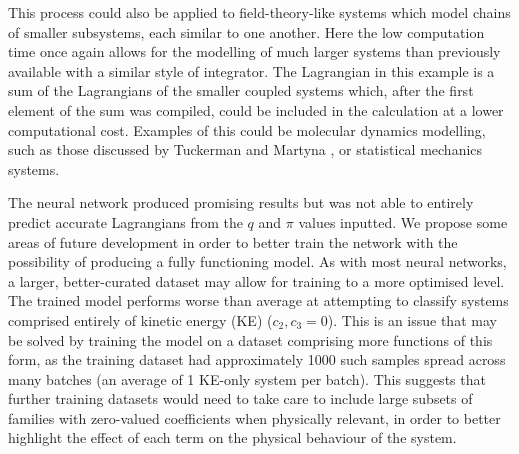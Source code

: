 \documentclass[10pt]{iopart}
\begin{document}
This process could also be applied to field-theory-like systems which model chains of smaller subsystems, each similar to one another. Here the low computation time once again allows for the modelling of much larger systems than previously available with a similar style of integrator. The Lagrangian in this example is a sum of the Lagrangians of the smaller coupled systems which, after the first element of the sum was compiled, could be included in the calculation at a lower computational cost. Examples of this could be molecular dynamics modelling, such as those discussed by Tuckerman and Martyna \cite{MolecularDynamics}, or statistical mechanics systems. 

The neural network produced promising results but was not able to entirely predict accurate Lagrangians from the $q$ and $\pi$ values inputted. We propose some areas of future development in order to better train the network with the possibility of producing a fully functioning model. As with most neural networks, a larger, better-curated dataset may allow for training to a more optimised level. The trained model performs worse than average at attempting to classify systems comprised entirely of kinetic energy (KE) ($c_2,c_3 = 0$). This is an issue that may be solved by training the model on a dataset comprising more functions of this form, as the training dataset had approximately 1000 such samples spread across many batches (an average of 1 KE-only system per batch). This suggests that further training datasets would need to take care to include large subsets of families with zero-valued coefficients when physically relevant, in order to better highlight the effect of each term on the physical behaviour of the system.
\end{document}

